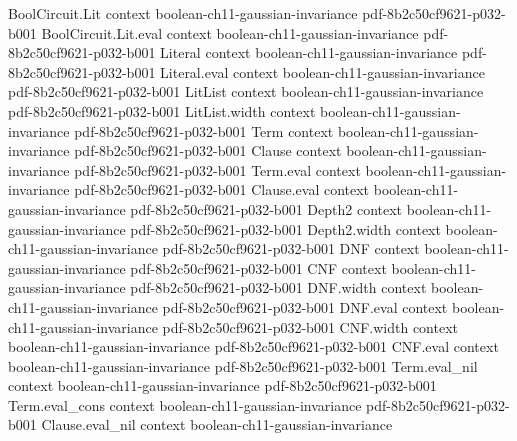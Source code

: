 \begin{lemma}
\label{BooleanAnalysis.GaussianSpace.inner_hermiteL2}
\leanok
{}
\proofstep
  {BoolCircuit.Lit}
  {context}
  {boolean-ch11-gaussian-invariance}
  {pdf-8b2c50cf9621-p032-b001}
\proofstep
  {BoolCircuit.Lit.eval}
  {context}
  {boolean-ch11-gaussian-invariance}
  {pdf-8b2c50cf9621-p032-b001}
\proofstep
  {Literal}
  {context}
  {boolean-ch11-gaussian-invariance}
  {pdf-8b2c50cf9621-p032-b001}
\proofstep
  {Literal.eval}
  {context}
  {boolean-ch11-gaussian-invariance}
  {pdf-8b2c50cf9621-p032-b001}
\proofstep
  {LitList}
  {context}
  {boolean-ch11-gaussian-invariance}
  {pdf-8b2c50cf9621-p032-b001}
\proofstep
  {LitList.width}
  {context}
  {boolean-ch11-gaussian-invariance}
  {pdf-8b2c50cf9621-p032-b001}
\proofstep
  {Term}
  {context}
  {boolean-ch11-gaussian-invariance}
  {pdf-8b2c50cf9621-p032-b001}
\proofstep
  {Clause}
  {context}
  {boolean-ch11-gaussian-invariance}
  {pdf-8b2c50cf9621-p032-b001}
\proofstep
  {Term.eval}
  {context}
  {boolean-ch11-gaussian-invariance}
  {pdf-8b2c50cf9621-p032-b001}
\proofstep
  {Clause.eval}
  {context}
  {boolean-ch11-gaussian-invariance}
  {pdf-8b2c50cf9621-p032-b001}
\proofstep
  {Depth2}
  {context}
  {boolean-ch11-gaussian-invariance}
  {pdf-8b2c50cf9621-p032-b001}
\proofstep
  {Depth2.width}
  {context}
  {boolean-ch11-gaussian-invariance}
  {pdf-8b2c50cf9621-p032-b001}
\proofstep
  {DNF}
  {context}
  {boolean-ch11-gaussian-invariance}
  {pdf-8b2c50cf9621-p032-b001}
\proofstep
  {CNF}
  {context}
  {boolean-ch11-gaussian-invariance}
  {pdf-8b2c50cf9621-p032-b001}
\proofstep
  {DNF.width}
  {context}
  {boolean-ch11-gaussian-invariance}
  {pdf-8b2c50cf9621-p032-b001}
\proofstep
  {DNF.eval}
  {context}
  {boolean-ch11-gaussian-invariance}
  {pdf-8b2c50cf9621-p032-b001}
\proofstep
  {CNF.width}
  {context}
  {boolean-ch11-gaussian-invariance}
  {pdf-8b2c50cf9621-p032-b001}
\proofstep
  {CNF.eval}
  {context}
  {boolean-ch11-gaussian-invariance}
  {pdf-8b2c50cf9621-p032-b001}
\proofstep
  {Term.eval_nil}
  {context}
  {boolean-ch11-gaussian-invariance}
  {pdf-8b2c50cf9621-p032-b001}
\proofstep
  {Term.eval_cons}
  {context}
  {boolean-ch11-gaussian-invariance}
  {pdf-8b2c50cf9621-p032-b001}
\proofstep
  {Clause.eval_nil}
  {context}
  {boolean-ch11-gaussian-invariance}

\end{lemma}
